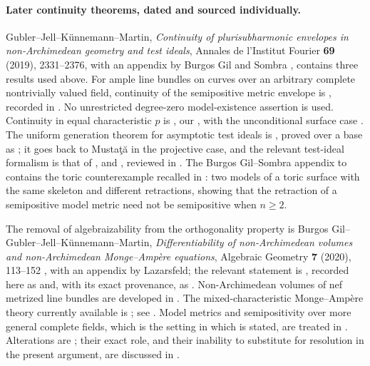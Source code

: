 \paragraph{Later continuity theorems, dated and sourced individually.}
Gubler--Jell--K\"unnemann--Martin, \emph{Continuity of plurisubharmonic
envelopes in non-Archimedean geometry and test ideals}, Annales de
l'Institut Fourier \textbf{69} (2019), 2331--2376, with an appendix by
Burgos Gil and Sombra \cite{GJKM19}, contains three results used above.
For ample line bundles on curves over an arbitrary complete nontrivially
valued field, continuity of the semipositive metric envelope is
\cite[Theorem~1.1]{GJKM19}, recorded in
.  No unrestricted degree-zero model-existence
assertion is used.  Continuity in equal
characteristic \(p\) is \cite[Theorem~8.2]{GJKM19}, our
, with the unconditional
surface case \cite[Corollary~8.3]{GJKM19}.  The uniform generation theorem
for asymptotic test ideals is \cite[Theorem~1.3]{GJKM19}, proved over a base
as \cite[Theorem~4.6]{GJKM19}; it goes back to Mustaţă in the projective
case, and the relevant test-ideal formalism is that of
\cite{MustataTest}, \cite{HY03} and \cite{ST12}, reviewed in
.  The Burgos Gil--Sombra appendix to
\cite{GJKM19} contains the toric counterexample recalled in
: two models of a toric surface with the
same skeleton and different retractions, showing that the retraction of a
semipositive model metric need not be semipositive when \(n\geq2\).

The removal of algebraizability from the orthogonality property is
Burgos Gil--Gubler--Jell--K\"unnemann--Martin, \emph{Differentiability of
non-Archimedean volumes and non-Archimedean Monge--Amp\`ere equations},
Algebraic Geometry \textbf{7} (2020), 113--152 \cite{BGGJKM20}, with an
appendix by Lazarsfeld; the relevant statement is
\cite[Theorem~6.3.3]{BGGJKM20}, recorded here as
 and, with its exact provenance,
as .  Non-Archimedean volumes of nef
metrized line bundles are developed in \cite{BGM21}.  The
mixed-characteristic Monge--Amp\`ere theory currently available is
\cite{FGK25}; see .  Model metrics and
semipositivity over more general complete fields, which is the setting in
which  is stated, are treated in
\cite{GM19}.  Alterations are \cite{deJong1996}; their exact role, and their
inability to substitute for resolution in the present argument, are
discussed in .

